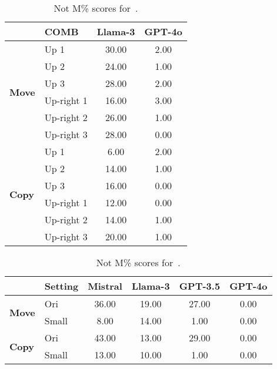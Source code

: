 \begin{table}[tb]
\small
\centering
\setlength{\tabcolsep}{3mm}
\begin{tabular}{llcc}
\toprule
& \textbf{COMB}& \textbf{Llama-3} & \textbf{GPT-4o} \\
\midrule[0.5pt]
\multirow{6}{*}{\textbf{Move}}&Up 1 &30.00&2.00\\
&Up 2 &24.00&1.00\\
&Up 3 &28.00&2.00\\
\cmidrule{2-4}
&Up-right 1 &16.00&3.00\\
&Up-right 2 &26.00&1.00\\
&Up-right 3 &28.00&0.00\\
\midrule[0.5pt]
\multirow{6}{*}{\textbf{Copy}}&Up 1&6.00&2.00\\
&Up 2 &14.00&1.00\\
&Up 3 &16.00&0.00\\
\cmidrule{2-4}
&Up-right 1 &12.00&0.00\\
&Up-right 2 &14.00&1.00\\
&Up-right 3 &20.00&1.00\\
\bottomrule
\end{tabular}
\caption{Not M\% scores for~.}

\label{tab:controllable_plus}
\end{table}

\begin{table}[tb]
\small
\centering
\setlength{\tabcolsep}{1.3mm}
\begin{tabular}{ll|cccc}
\toprule
& \textbf{Setting} & \textbf{Mistral} & \textbf{Llama-3} & \textbf{GPT-3.5} & \textbf{GPT-4o} \\
\midrule[0.5pt]
\multirow{2}{*}{\textbf{Move}}& Ori &36.00 &19.00 &27.00 &0.00 \\
& Small & 8.00&14.00 &1.00 &0.00\\
\midrule
\multirow{2}{*}{\textbf{Copy}}&Ori &43.00 &13.00 &29.00 &0.00\\
&Small & 13.00& 10.00& 1.00&0.00 \\
\bottomrule
\end{tabular}
\caption{Not M\% scores for~.}

\label{tab:large matrix_plus}
\end{table}

